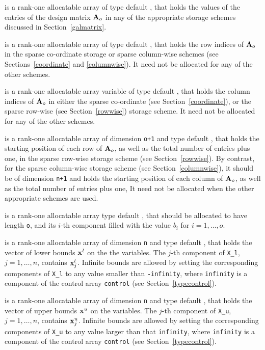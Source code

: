 \documentclass{galahad}
\begin{document}
\begin{description}
\begin{description}
 is a rank-one allocatable array of type default \realdp, that
holds the values of the entries of the design matrix ${\mathbf{A}}_o$ in any of the
appropriate storage schemes discussed in Section~\ref{galmatrix}.

 is a rank-one allocatable array of type default \integer,
that holds the row indices of ${\mathbf{A}}_o$ in the sparse co-ordinate storage
or sparse column-wise schemes
(see Sections~\ref{coordinate} and \ref{columnwise}).
It need not be allocated for any of the other schemes.

 is a rank-one allocatable array variable of type default \integer,
that holds the column indices of ${\mathbf{A}}_o$ in either the sparse co-ordinate
(see Section~\ref{coordinate}), or the sparse row-wise
(see Section~\ref{rowwise}) storage scheme.
It need not be allocated for any of the other schemes.

 is a rank-one allocatable array of dimension {\tt o+1} and type
default \integer, that holds the starting position of each row of ${\mathbf{A}}_o$,
as well as the total number of entries plus one,
in the sparse row-wise storage scheme (see Section~\ref{rowwise}).
By contrast, for the sparse column-wise storage scheme
(see Section~\ref{columnwise}), it should be of dimension {\tt n+1}
and holds the starting position of each column of ${\mathbf{A}}_o$,
as well as the total number of entries plus one,
It need not be allocated when the other appropriate schemes are used.

\end{description}

 is a rank-one allocatable array type default \realdp, that
should be allocated to have length {\tt o}, and its $i$-th component
filled with the value $b_{i}$ for $i = 1, \ldots , o$.

 is a rank-one allocatable array of dimension {\tt n} and type
default \realdp, that holds
the vector of lower bounds ${\mathbf{x}}^{l}$ on the the variables.
The $j$-th component of {\tt X\_l}, $j = 1, \ldots , n$,
contains ${\mathbf{x}}_{j}^{l}$.
Infinite bounds are allowed by setting the corresponding
components of {\tt X\_l} to any value smaller than {\tt -infinity},
where {\tt infinity} is a component of the control array {\tt control}
(see Section~\ref{typecontrol}).

 is a rank-one allocatable array of dimension {\tt n} and type
default \realdp, that holds
the vector of upper bounds ${\mathbf{x}}^{u}$ on the variables.
The $j$-th component of {\tt X\_u}, $j = 1, \ldots , n$,
contains ${\mathbf{x}}_{j}^{u}$.
Infinite bounds are allowed by setting the corresponding
components of {\tt X\_u} to any value larger than that {\tt infinity},
where {\tt infinity} is a component of the control array {\tt control}
(see Section~\ref{typecontrol}).


\end{description}
\end{document}
